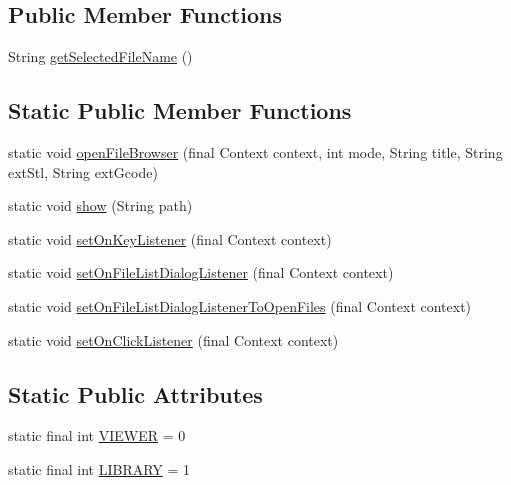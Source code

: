 \subsection*{Public Member Functions}
\begin{DoxyCompactItemize}
\item 
String \hyperlink{classandroid_1_1app_1_1printerapp_1_1viewer_1_1_file_browser_a36a48abd2d4052522856b777bb33383d}{get\+Selected\+File\+Name} ()
\end{DoxyCompactItemize}
\subsection*{Static Public Member Functions}
\begin{DoxyCompactItemize}
\item 
static void \hyperlink{classandroid_1_1app_1_1printerapp_1_1viewer_1_1_file_browser_a8a922f003ca226722560529fe8b3d6db}{open\+File\+Browser} (final Context context, int mode, String title, String ext\+Stl, String ext\+Gcode)
\item 
static void \hyperlink{classandroid_1_1app_1_1printerapp_1_1viewer_1_1_file_browser_a8e2ace0c773884f1055bf4b4183fca77}{show} (String path)
\item 
static void \hyperlink{classandroid_1_1app_1_1printerapp_1_1viewer_1_1_file_browser_aff7f20b96c3b27803470b8f81e30c524}{set\+On\+Key\+Listener} (final Context context)
\item 
static void \hyperlink{classandroid_1_1app_1_1printerapp_1_1viewer_1_1_file_browser_aa6a48f456fa459a1dd1cf349f00311db}{set\+On\+File\+List\+Dialog\+Listener} (final Context context)
\item 
static void \hyperlink{classandroid_1_1app_1_1printerapp_1_1viewer_1_1_file_browser_ad4e4d6b598ade09a7f012b6b7c4e9629}{set\+On\+File\+List\+Dialog\+Listener\+To\+Open\+Files} (final Context context)
\item 
static void \hyperlink{classandroid_1_1app_1_1printerapp_1_1viewer_1_1_file_browser_ae7c513f5fb1e801e21485be991f4161f}{set\+On\+Click\+Listener} (final Context context)
\end{DoxyCompactItemize}
\subsection*{Static Public Attributes}
\begin{DoxyCompactItemize}
\item 
static final int \hyperlink{classandroid_1_1app_1_1printerapp_1_1viewer_1_1_file_browser_a21928d76d46d4162b261829eded926de}{V\+I\+E\+W\+ER} = 0
\item 
static final int \hyperlink{classandroid_1_1app_1_1printerapp_1_1viewer_1_1_file_browser_a40eb3e601c0c769a1f9506aaaeaa9a64}{L\+I\+B\+R\+A\+RY} = 1
\end{DoxyCompactItemize}


